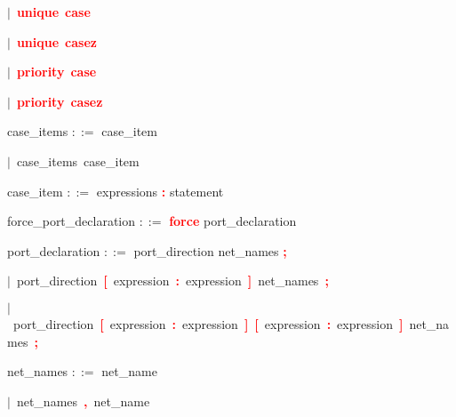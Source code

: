 \mbox{$|$ \textbf{\textcolor{red}{unique}} \textbf{\textcolor{red}{case}}}

\mbox{$|$ \textbf{\textcolor{red}{unique}} \textbf{\textcolor{red}{casez}}}

\mbox{$|$ \textbf{\textcolor{red}{priority}} \textbf{\textcolor{red}{case}}}

\mbox{$|$ \textbf{\textcolor{red}{priority}} \textbf{\textcolor{red}{casez}}}

\vspace{1em}
\noindent
\settowidth{\parindent}{\hspace{4ex}}
case\_items $::=$\hspace{1ex} case\_item

\mbox{$|$ case\_items case\_item}

\vspace{1em}
\noindent
\settowidth{\parindent}{\hspace{4ex}}
case\_item $::=$\hspace{1ex} expressions \textbf{\textcolor{red}{:}} statement

\vspace{1em}
\noindent
\settowidth{\parindent}{\hspace{4ex}}
force\_port\_declaration $::=$\hspace{1ex} \textbf{\textcolor{red}{force}} port\_declaration

\vspace{1em}
\noindent
\settowidth{\parindent}{\hspace{4ex}}
port\_declaration $::=$\hspace{1ex} port\_direction net\_names \textbf{\textcolor{red}{;}}

\mbox{$|$ port\_direction \textbf{\textcolor{red}{[}} expression \textbf{\textcolor{red}{:}} expression \textbf{\textcolor{red}{]}} net\_names \textbf{\textcolor{red}{;}}}

\mbox{$|$ port\_direction \textbf{\textcolor{red}{[}} expression \textbf{\textcolor{red}{:}} expression \textbf{\textcolor{red}{]}} \textbf{\textcolor{red}{[}} expression \textbf{\textcolor{red}{:}} expression \textbf{\textcolor{red}{]}} net\_names \textbf{\textcolor{red}{;}}}

\vspace{1em}
\noindent
\settowidth{\parindent}{\hspace{4ex}}
net\_names $::=$\hspace{1ex} net\_name

\mbox{$|$ net\_names \textbf{\textcolor{red}{,}} net\_name}

